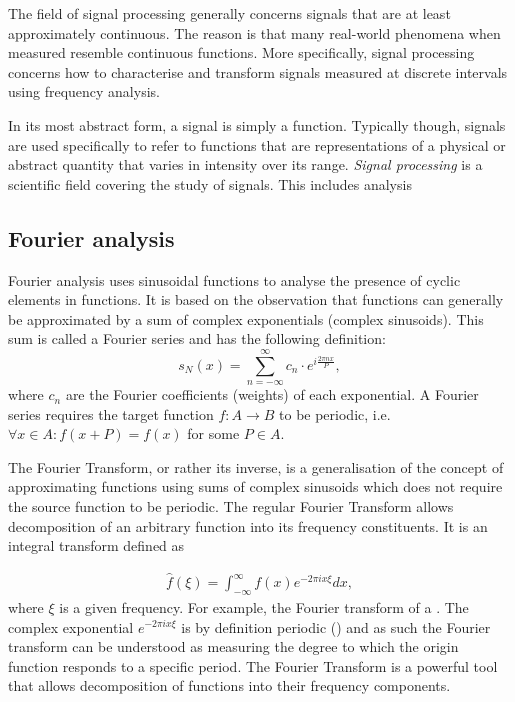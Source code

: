 The field of signal processing generally concerns signals that are at least approximately continuous. The reason is that many real-world phenomena when measured resemble continuous functions. More specifically, signal processing concerns how to characterise and transform signals measured at discrete intervals using frequency analysis.  



In its most abstract form, a signal is simply a function. Typically though, signals are used specifically to refer to functions that are representations of a physical or abstract quantity that varies in intensity over its range. \emph{Signal processing} is a scientific field covering the study of signals. This includes analysis 

\subsection{Fourier analysis}
Fourier analysis uses sinusoidal functions to analyse the presence of cyclic elements in functions. It is based on the observation that functions can generally be approximated by a sum of complex exponentials (complex sinusoids). This sum is called a Fourier series and has the following definition:
\begin{equation}
    s_N(x) = \sum_{n=-\infty}^{\infty} c_n \cdot e^{i\frac{2\pi n x}{P}},
\end{equation}
where $c_n$ are the Fourier coefficients (weights) of each exponential. A Fourier series requires the target function $f: A \rightarrow B$ to be periodic, i.e. $\forall x\in A: f(x+P) = f(x)$ for some $P\in A$.

The Fourier Transform, or rather its inverse, is a generalisation of the concept of approximating functions using sums of complex sinusoids which does not require the source function to be periodic. The regular Fourier Transform allows decomposition of an arbitrary function into its frequency constituents. It is an integral transform defined as

\begin{align}\label{eq:conv}
	\hat{f}(\xi) = \int_{-\infty}^{\infty} f(x) e^{-2\pi i x\xi}dx,
\end{align}
where $\xi$ is a given frequency. For example, the Fourier transform of a . The complex exponential $e^{-2\pi i x\xi}$ is by definition periodic () and as such the Fourier transform can be understood as measuring the degree to which the origin function responds to a specific period. The Fourier Transform is a powerful tool that allows decomposition of functions into their frequency components. 

